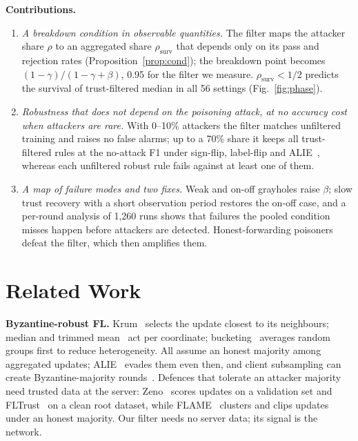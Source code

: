 \documentclass[conference]{IEEEtran}
\newcommand{\rsurv}{\rho_{\mathrm{surv}}}
\begin{document}
\textbf{Contributions.}
\begin{enumerate}
\item \emph{A breakdown condition in observable quantities.} The filter maps the attacker share $\rho$ to an
aggregated share $\rsurv$ that depends only on its pass and rejection rates (Proposition~\ref{prop:cond}); the
breakdown point becomes $(1-\gamma)/(1-\gamma+\beta)$, 0.95 for the filter we measure. $\rsurv < 1/2$ predicts the
survival of trust-filtered median in all 56 settings (Fig.~\ref{fig:phase}).
\item \emph{Robustness that does not depend on the poisoning attack, at no accuracy cost when attackers are rare.}
With 0--10\% attackers the filter matches unfiltered training and raises no false alarms; up to a 70\% share it
keeps all trust-filtered rules at the no-attack F1 under sign-flip, label-flip and ALIE~\cite{baruch2019}, whereas each unfiltered robust rule fails
against at least one of them.
\item \emph{A map of failure modes and two fixes.} Weak and on-off grayholes raise $\beta$; slow trust recovery with
a short observation period restores the on-off case, and a per-round analysis of 1{,}260 runs shows that failures
the pooled condition misses happen before attackers are detected. Honest-forwarding poisoners defeat the filter,
which then amplifies them.
\end{enumerate}

\section{Related Work}

\textbf{Byzantine-robust FL.} Krum~\cite{blanchard2017} selects the update closest to its neighbours; median and
trimmed mean~\cite{yin2018} act per coordinate; bucketing~\cite{karimireddy2022} averages random groups first to
reduce heterogeneity. All assume an honest majority among aggregated updates; ALIE~\cite{baruch2019} evades them
even then, and client subsampling can create Byzantine-majority rounds~\cite{allouah2024}. Defences that
tolerate an attacker majority need trusted data at the server: Zeno~\cite{xie2019zeno} scores updates on a
validation set and FLTrust~\cite{cao2021fltrust} on a clean root dataset, while FLAME~\cite{nguyen2022flame}
clusters and clips updates under an honest majority. Our filter needs no server data; its signal is the network.
\end{document}
